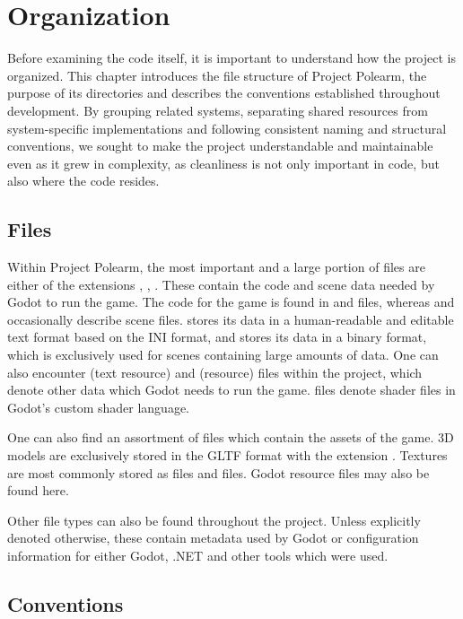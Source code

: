 \documentclass[../Main.tex]{subfiles}
\begin{document}
\section{Organization}\label{sec:organization}

Before examining the code itself, it is important to understand how the project is organized. This chapter introduces the file structure of Project Polearm, the purpose of its directories and describes the conventions established throughout development. By grouping related systems, separating shared resources from system-specific implementations and following consistent naming and structural conventions, we sought to make the project understandable and maintainable even as it grew in complexity, as cleanliness is not only important in code, but also where the code resides.

\subsection{Files}\label{sec:files}

Within Project Polearm, the most important and a large portion of files are either of the extensions , , . These contain the code and scene data needed by Godot to run the game. The code for the game is found in  and  files, whereas  and occasionally  describe scene files.  stores its data in a human-readable and editable text format based on the INI format, and  stores its data in a binary format, which is exclusively used for scenes containing large amounts of data. One can also encounter  (text resource) and  (resource) files within the project, which denote other data which Godot needs to run the game.  files denote shader files in Godot's custom shader language.

One can also find an assortment of files which contain the assets of the game. 3D models are exclusively stored in the GLTF format with the extension . Textures are most commonly stored as  files and  files. Godot resource files may also be found here.

Other file types can also be found throughout the project. Unless explicitly denoted otherwise, these contain metadata used by Godot or configuration information for either Godot, .NET and other tools which were used.

\subsection{Conventions}\label{sec:conventions}
\end{document}
